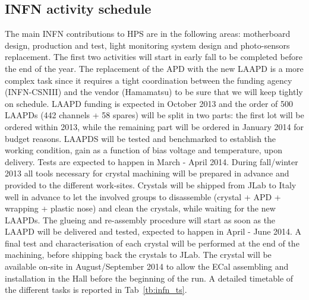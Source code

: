 \documentclass[11pt]{report}
\begin{document}
\subsection{INFN activity schedule}
The main INFN contributions to HPS are in the following areas: motherboard design, production and test, light monitoring system design and photo-sensors replacement.
 The first two activities will start in early fall to be completed before the end of the year. The replacement of the APD with the new LAAPD is a more complex task since it requires a 
tight coordination between the funding agency (INFN-CSNIII) and the vendor (Hamamatsu) to be sure that  we will keep tightly on schedule.
LAAPD funding is expected in October 2013 and the order of 500 LAAPDs (442 channels + 58 spares)  will be split in two parts: the first lot will be ordered within 2013, while the
remaining part will be ordered in January 2014 for budget reasons. LAAPDS will be tested and benchmarked to establish the working condition, gain as a function of bias voltage and temperature,
upon delivery. Tests are expected to happen in  March - April 2014. During fall/winter 2013 all tools necessary for crystal machining will be prepared in advance and provided to the different work-sites.
 Crystals will be shipped from JLab to Italy well in advance to let the involved groups to disassemble
(crystal + APD + wrapping + plastic nose) and clean the crystals,  while  waiting for the new LAAPDs. The glueing and re-assembly procedure will start as soon as the LAAPD will be delivered and tested,  
expected  to happen in April - June 2014. A final test and characterisation of  each crystal will be performed at the end of the machining,  before shipping back the crystals to JLab.
The crystal will be available on-site in August/September 2014 to allow the ECal assembling and installation in the Hall before the beginning of the run. A detailed timetable of the different
 tasks is reported in Tab~\ref{tb:infn_ts}.
\end{document}
